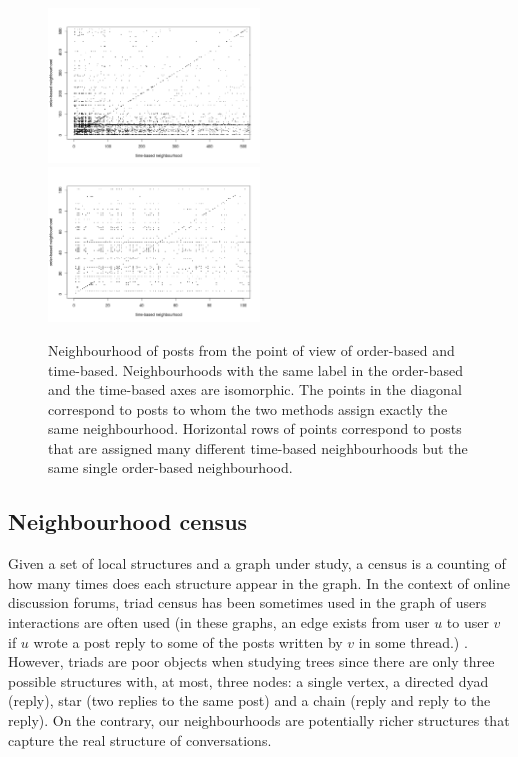 \documentclass[conference]{IEEEtran}
\begin{document}
\begin{figure}
\centering
\includegraphics[width=0.5\textwidth]{confusion_time_order_gameofthrones}%
\includegraphics[width=0.5\textwidth]{confusion_time_order_gameofthrones_zoom}
\caption{Neighbourhood of posts from the point of view of order-based and time-based. Neighbourhoods with the same label in the order-based and the time-based axes are isomorphic. The points in the diagonal correspond to posts to whom the two methods assign exactly the same neighbourhood. Horizontal rows of points correspond to posts that are assigned many different time-based neighbourhoods but the same single order-based neighbourhood.}
\label{fig:confusion}
\end{figure}

\subsection{Neighbourhood census}
Given a set of local structures and a graph under study, a census is a counting of how many times does each structure appear in the graph. In the context of online discussion forums, triad census has been sometimes used in the graph of users interactions are often used (in these graphs, an edge exists from user $u$ to user $v$ if $u$ wrote a post reply to some of the posts written by $v$ in some thread.) \cite{Adamic2008, Lumbreras2013}. However, triads are poor objects when studying trees since there are only three possible structures with, at most, three nodes: a single vertex, a directed dyad (reply), star (two replies to the same post) and a chain (reply and reply to the reply). On the contrary, our neighbourhoods are potentially richer structures that capture the real structure of conversations.
\end{document}
